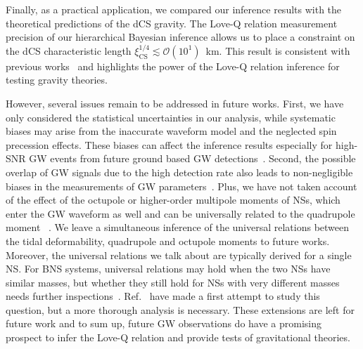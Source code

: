 \documentclass[a4paper,11pt]{article}
\begin{document}
Finally, as a practical application, we compared our inference results with the 
theoretical predictions of the dCS gravity. The Love-Q relation measurement 
precision of our hierarchical Bayesian inference allows us to place a constraint 
on the dCS characteristic length $\xi_{\mathrm{CS}}^{1/4} \lesssim \mathcal{O}(10^1)$~km. 
This result is consistent with previous works~\cite{Yagi:2013bca,Yagi:2013awa} and 
highlights the power of the Love-Q relation inference for testing gravity theories.

However, several issues remain to be addressed in future works. First, we have 
only considered the statistical uncertainties in our analysis, while systematic 
biases may arise from the inaccurate waveform model and the neglected spin 
precession effects. These biases can affect the inference results especially for 
high-SNR GW events from future ground based GW detections~\cite{Williamson:2017evr,Purrer:2019jcp,Gamba:2020wgg}. 
Second, the possible overlap of GW signals due to the high detection rate also 
leads to non-negligible biases in the measurements of GW parameters~\cite{Pizzati:2021apa,Hu:2022bji,Wang:2023ldq}. 
Plus, we have not taken account of the effect of the octupole or higher-order multipole moments of NSs, 
which enter the GW waveform as well and can be universally related to the quadrupole moment
~\cite{Yagi_2017,Abac:2023ujg}. We leave a simultaneous inference of the universal 
relations between the tidal deformability, quadrupole and octupole moments to 
future works. Moreover, the universal relations we talk about are typically 
derived for a single NS. For BNS systems, universal relations may hold when the 
two NSs have similar masses, but whether they still hold for NSs with very 
different masses needs further inspections~\cite{Shao:2022koz}. Ref.~\cite{Saffer:2021gak} 
have made a first attempt to study this question, but a more thorough analysis is necessary. 
These extensions are left for future work and to sum up, future GW observations do have a 
promising prospect to infer the Love-Q relation and provide tests of gravitational theories. 

\acknowledgments

\clearpage


% 

\end{document}
